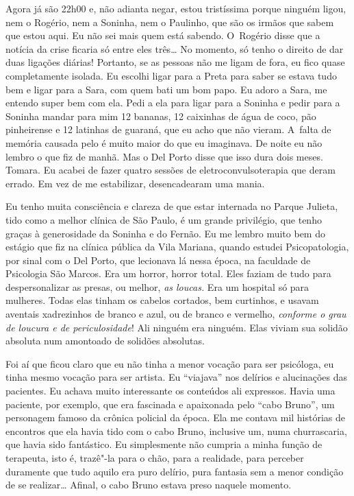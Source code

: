 Agora já são 22h00 e, não adianta negar, estou tristíssima porque
ninguém ligou, nem o Rogério, nem a Soninha, nem o Paulinho, que são os
irmãos que sabem que estou aqui. Eu não sei mais quem está sabendo. O~Rogério disse que a notícia da crise ficaria só entre eles três…
No momento, só tenho o direito de dar duas ligações diárias! Portanto,
se as pessoas não me ligam de fora, eu fico quase completamente isolada.
Eu escolhi ligar para a Preta para saber se estava tudo bem e ligar para
a Sara, com quem bati um bom papo. Eu adoro a Sara, me entendo super bem
com ela. Pedi a ela para ligar para a Soninha e pedir para a Soninha
mandar para mim 12 bananas, 12 caixinhas de água de coco, pão
pinheirense e 12 latinhas de guaraná, que eu acho que não vieram. A~falta de memória causada pelo  é muito maior do que eu imaginava. De
noite eu não lembro o que fiz de manhã. Mas o Del Porto disse que isso
dura dois meses. Tomara. Eu acabei de fazer quatro sessões de
eletroconvulsoterapia que deram errado. Em vez de me estabilizar,
desencadearam uma mania.

Eu tenho muita consciência e clareza de que estar internada no Parque
Julieta, tido como a melhor clínica de São Paulo, é um grande
privilégio, que tenho graças à generosidade da Soninha e do Fernão. Eu
me lembro muito bem do estágio que fiz na clínica pública da Vila
Mariana, quando estudei Psicopatologia, por sinal com o Del Porto, que
lecionava lá nessa época, na faculdade de Psicologia São Marcos. Era um
horror, horror total. Eles faziam de tudo para despersonalizar as
presas, ou melhor, \emph{as loucas.} Era um hospital só para mulheres.
Todas elas tinham os cabelos cortados, bem curtinhos, e usavam aventais
xadrezinhos de branco e azul, ou de branco e vermelho, \emph{conforme o
grau de loucura e de periculosidade}! Ali ninguém era ninguém. Elas
viviam sua solidão absoluta num amontoado de solidões absolutas.

Foi aí que ficou claro que eu não tinha a menor vocação para ser
psicóloga, eu tinha mesmo vocação para ser artista. Eu ``viajava'' nos
delírios e alucinações das pacientes. Eu achava muito interessante os
conteúdos ali expressos. Havia uma paciente, por exemplo, que era
fascinada e apaixonada pelo ``cabo Bruno'', um personagem famoso da
crônica policial da época. Ela me contava mil histórias de encontros que
ela havia tido com o cabo Bruno, inclusive um, numa churrascaria, que
havia sido fantástico. Eu simplesmente não cumpria a minha função de
terapeuta, isto é, trazê"-la para o chão, para a realidade, para perceber
duramente que tudo aquilo era puro delírio, pura fantasia sem a menor
condição de se realizar… Afinal, o cabo Bruno estava preso naquele
momento.

